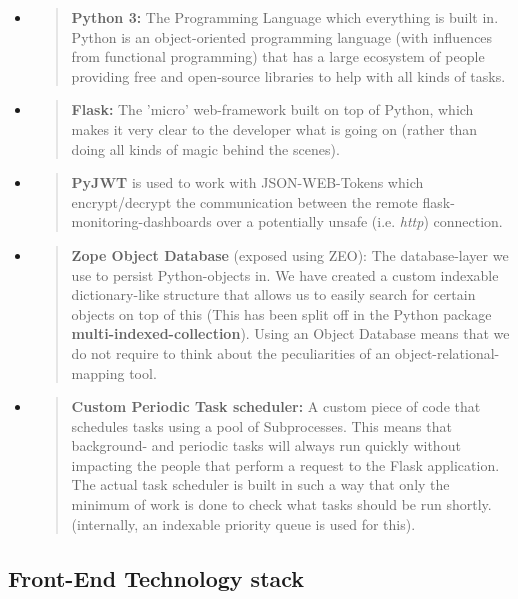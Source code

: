 \begin{itemize}
\item
  \begin{quote}
  \textbf{Python 3:} The Programming Language which everything is built
  in. Python is an object-oriented programming language (with influences
  from functional programming) that has a large ecosystem of people
  providing free and open-source libraries to help with all kinds of
  tasks.
  \end{quote}
\item
  \begin{quote}
  \textbf{Flask:} The 'micro' web-framework built on top of Python,
  which makes it very clear to the developer what is going on (rather
  than doing all kinds of magic behind the scenes).
  \end{quote}
\item
  \begin{quote}
  \textbf{PyJWT} is used to work with JSON-WEB-Tokens which
  encrypt/decrypt the communication between the remote
  flask-monitoring-dashboards over a potentially unsafe (i.e.
  \emph{http}) connection.
  \end{quote}
\item
  \begin{quote}
  \textbf{Zope Object Database} (exposed using ZEO): The database-layer
  we use to persist Python-objects in. We have created a custom
  indexable dictionary-like structure that allows us to easily search
  for certain objects on top of this (This has been split off in the
  Python package \textbf{multi-indexed-collection}). Using an Object
  Database means that we do not require to think about the peculiarities
  of an object-relational-mapping tool.
  \end{quote}
\item
  \begin{quote}
  \textbf{Custom Periodic Task scheduler:} A custom piece of code that
  schedules tasks using a pool of Subprocesses. This means that
  background- and periodic tasks will always run quickly without
  impacting the people that perform a request to the Flask application.
  The actual task scheduler is built in such a way that only the minimum
  of work is done to check what tasks should be run shortly.
  (internally, an indexable priority queue is used for this).
  \end{quote}
\end{itemize}

\hypertarget{front-end-technology-stack}{%
\subsection{Front-End Technology
stack}\label{front-end-technology-stack}}


